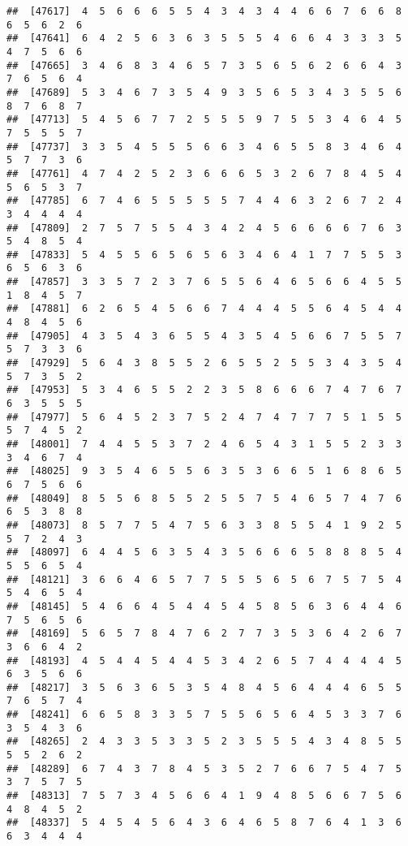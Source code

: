 \documentclass[
]{book}
\begin{document}
\begin{verbatim}
##  [47617]  4  5  6  6  6  5  5  4  3  4  3  4  4  6  6  7  6  6  8  6  5  6  2  6
##  [47641]  6  4  2  5  6  3  6  3  5  5  5  4  6  6  4  3  3  3  5  4  7  5  6  6
##  [47665]  3  4  6  8  3  4  6  5  7  3  5  6  5  6  2  6  6  4  3  7  6  5  6  4
##  [47689]  5  3  4  6  7  3  5  4  9  3  5  6  5  3  4  3  5  5  6  8  7  6  8  7
##  [47713]  5  4  5  6  7  7  2  5  5  5  9  7  5  5  3  4  6  4  5  7  5  5  5  7
##  [47737]  3  3  5  4  5  5  5  6  6  3  4  6  5  5  8  3  4  6  4  5  7  7  3  6
##  [47761]  4  7  4  2  5  2  3  6  6  6  5  3  2  6  7  8  4  5  4  5  6  5  3  7
##  [47785]  6  7  4  6  5  5  5  5  5  7  4  4  6  3  2  6  7  2  4  3  4  4  4  4
##  [47809]  2  7  5  7  5  5  4  3  4  2  4  5  6  6  6  6  7  6  3  5  4  8  5  4
##  [47833]  5  4  5  5  6  5  6  5  6  3  4  6  4  1  7  7  5  5  3  6  5  6  3  6
##  [47857]  3  3  5  7  2  3  7  6  5  5  6  4  6  5  6  6  4  5  5  1  8  4  5  7
##  [47881]  6  2  6  5  4  5  6  6  7  4  4  4  5  5  6  4  5  4  4  4  8  4  5  6
##  [47905]  4  3  5  4  3  6  5  5  4  3  5  4  5  6  6  7  5  5  7  5  7  3  3  6
##  [47929]  5  6  4  3  8  5  5  2  6  5  5  2  5  5  3  4  3  5  4  5  7  3  5  2
##  [47953]  5  3  4  6  5  5  2  2  3  5  8  6  6  6  7  4  7  6  7  6  3  5  5  5
##  [47977]  5  6  4  5  2  3  7  5  2  4  7  4  7  7  7  5  1  5  5  5  7  4  5  2
##  [48001]  7  4  4  5  5  3  7  2  4  6  5  4  3  1  5  5  2  3  3  3  4  6  7  4
##  [48025]  9  3  5  4  6  5  5  6  3  5  3  6  6  5  1  6  8  6  5  6  7  5  6  6
##  [48049]  8  5  5  6  8  5  5  2  5  5  7  5  4  6  5  7  4  7  6  6  5  3  8  8
##  [48073]  8  5  7  7  5  4  7  5  6  3  3  8  5  5  4  1  9  2  5  5  7  2  4  3
##  [48097]  6  4  4  5  6  3  5  4  3  5  6  6  6  5  8  8  8  5  4  5  5  6  5  4
##  [48121]  3  6  6  4  6  5  7  7  5  5  5  6  5  6  7  5  7  5  4  5  4  6  5  4
##  [48145]  5  4  6  6  4  5  4  4  5  4  5  8  5  6  3  6  4  4  6  7  5  6  5  6
##  [48169]  5  6  5  7  8  4  7  6  2  7  7  3  5  3  6  4  2  6  7  3  6  6  4  2
##  [48193]  4  5  4  4  5  4  4  5  3  4  2  6  5  7  4  4  4  4  5  6  3  5  6  6
##  [48217]  3  5  6  3  6  5  3  5  4  8  4  5  6  4  4  4  6  5  5  7  6  5  7  4
##  [48241]  6  6  5  8  3  3  5  7  5  5  6  5  6  4  5  3  3  7  6  3  5  4  3  6
##  [48265]  2  4  3  3  5  3  3  5  2  3  5  5  5  4  3  4  8  5  5  5  5  2  6  2
##  [48289]  6  7  4  3  7  8  4  5  3  5  2  7  6  6  7  5  4  7  5  3  7  5  7  5
##  [48313]  7  5  7  3  4  5  6  6  4  1  9  4  8  5  6  6  7  5  6  4  8  4  5  2
##  [48337]  5  4  5  4  5  6  4  3  6  4  6  5  8  7  6  4  1  3  6  6  3  4  4  4

\end{verbatim}
\end{document}

